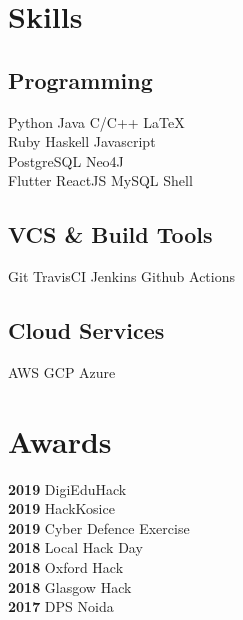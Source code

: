 \documentclass[]{deedy-resume-openfont}
\begin{document}
\begin{minipage}[t]{0.66\textwidth}
%
%


\end{minipage}%
\hfill
\begin{minipage}[t]{0.33\textwidth} 


\section{Skills}
\subsection{Programming}
Python \textbullet{} Java \textbullet{} C/C++ \textbullet{} \LaTeX\ \\ 
Ruby \textbullet{} Haskell \textbullet{} Javascript \\
PostgreSQL \textbullet{} Neo4J \\
Flutter \textbullet{}
ReactJS \textbullet{ }MySQL \textbullet{} Shell
\subsection{VCS \& Build Tools}
Git \textbullet{} TravisCI \textbullet{}Jenkins \textbullet{} Github Actions
\subsection{Cloud Services}
AWS \textbullet{} GCP \textbullet{} Azure
\sectionsep


\section{Awards} 

\textbf{2019 } DigiEduHack \\
\textbf{2019 } HackKosice \\
\textbf{2019 } Cyber Defence Exercise\\
\textbf{2018 } Local Hack Day\\
\textbf{2018 } Oxford Hack \\
\textbf{2018 } Glasgow Hack \\
\textbf{2017 } DPS Noida


\end{minipage}
\end{document}
